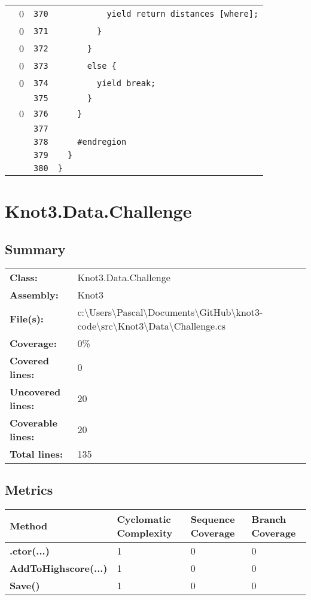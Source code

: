 \documentclass[a4paper,10pt]{article}
\begin{document}
\begin{longtable}[l]{lrrl}
\cellcolor{red} & 0 & \verb~370~ & \verb~          yield return distances [where];~\\
\cellcolor{red} & 0 & \verb~371~ & \verb~        }~\\
\cellcolor{red} & 0 & \verb~372~ & \verb~      }~\\
\cellcolor{red} & 0 & \verb~373~ & \verb~      else {~\\
\cellcolor{red} & 0 & \verb~374~ & \verb~        yield break;~\\
\cellcolor{gray} &  & \verb~375~ & \verb~      }~\\
\cellcolor{red} & 0 & \verb~376~ & \verb~    }~\\
\cellcolor{gray} &  & \verb~377~ & \verb~~\\
\cellcolor{gray} &  & \verb~378~ & \verb~    #endregion~\\
\cellcolor{gray} &  & \verb~379~ & \verb~  }~\\
\cellcolor{gray} &  & \verb~380~ & \verb~}~\\
\end{longtable}
\newpage
\section{Knot3.Data.Challenge}
\subsection{Summary}
\begin{longtable}[l]{ll}
\textbf{Class:} & Knot3.Data.Challenge\\
\textbf{Assembly:} & Knot3\\
\textbf{File(s):} & \begin{minipage}[t]{12cm}{c:\textbackslash Users\textbackslash Pascal\textbackslash Documents\textbackslash GitHub\textbackslash knot3-code\textbackslash src\textbackslash Knot3\textbackslash Data\textbackslash Challenge.cs}\end{minipage} \\
\textbf{Coverage:} & 0\%\\
\textbf{Covered lines:} & 0\\
\textbf{Uncovered lines:} & 20\\
\textbf{Coverable lines:} & 20\\
\textbf{Total lines:} & 135\\
\end{longtable}
\subsection{Metrics}
\begin{longtable}[l]{|l|l|l|l|}
\hline
\textbf{Method} & \textbf{Cyclomatic Complexity} & \textbf{Sequence Coverage} & \textbf{Branch Coverage}\\
\hline
\textbf{.ctor(...)} & 1 & 0 & 0\\
\hline
\textbf{AddToHighscore(...)} & 1 & 0 & 0\\
\hline
\textbf{Save()} & 1 & 0 & 0\\
\hline
\end{longtable}
\end{document}
